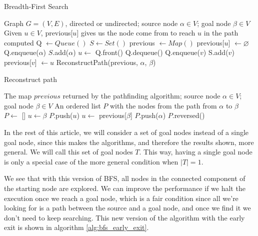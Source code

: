 \documentclass[12pt]{report}
\begin{document}
\begin{algorithm}
\caption{Breadth-First Search}
\label{alg:bfs}
\begin{algorithmic}[1]
\Require Graph $G = (V, E)$, directed or undirected; source node $\alpha \in V$; goal node $\beta \in V$
\Ensure Given $u \in V$, previous[$u$] gives us the node come from to reach $u$ in the path computed
\State Q $\gets Queue()$
\State $S \gets Set()$ 
\State previous $\gets Map()$
	\State previous[$u$] $\gets \varnothing$
\EndFor
\State Q.enqueue($\alpha$)
\State $S$.add($\alpha$)
	\State $u \gets$ Q.front()
	\State Q.dequeue()
			\State Q.enqueue($v$)
			\State S.add($v$)
			\State previous[$v$] $\gets u$
		\EndIf
	\EndFor
\EndWhile
\State \Return ReconstructPath(previous, $\alpha$, $\beta$)
\EndProcedure
\end{algorithmic}
\end{algorithm}

\begin{algorithm}
\caption{Reconstruct path}
\label{alg:reconstruct}
\begin{algorithmic}[1]
\Require The map $previous$ returned by the pathfinding algorithm; source node $\alpha \in V$; goal node $\beta \in V$
\Ensure An ordered list $P$ with the nodes from the path from $\alpha$ to $\beta$
\State $P \gets$ []  
\State $u \gets \beta$
	\State $P$.push($u$)
	\State $u \gets$ previous[$\beta$]
\EndWhile
\State $P$.push($\alpha$)
\State \Return $P$.reversed()
\EndProcedure
\end{algorithmic}
\end{algorithm}

In the rest of this article, we will consider a set of goal nodes instead of a single goal node, since this makes the algorithms, and therefore the results shown, more general. We will call this set of goal nodes $T$. This way, having a single goal node is only a special case of the more general condition when $|T| = 1$.

We see that with this version of BFS, all nodes in the connected component of the starting node are explored. We can improve the performance if we halt the execution once we reach a goal node, which is a fair condition since all we're looking for is a path between the source and a goal node, and once we find it we don't need to keep searching. This new version of the algorithm with the early exit is shown in algorithm \ref{alg:bfs_early_exit}.
\end{document}

